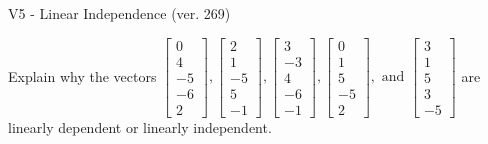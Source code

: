 \begin{exercise}
  \begin{exerciseTitle}V5 - Linear Independence (ver. 269)\end{exerciseTitle}
  \begin{exerciseStatement}
    Explain why the vectors \(\left[\begin{array}{r}
0 \\
4 \\
-5 \\
-6 \\
2
\end{array}\right] , \left[\begin{array}{r}
2 \\
1 \\
-5 \\
5 \\
-1
\end{array}\right] , \left[\begin{array}{r}
3 \\
-3 \\
4 \\
-6 \\
-1
\end{array}\right] , \left[\begin{array}{r}
0 \\
1 \\
5 \\
-5 \\
2
\end{array}\right] , \text{ and } \left[\begin{array}{r}
3 \\
1 \\
5 \\
3 \\
-5
\end{array}\right]\) are linearly dependent or linearly independent.	



\end{exerciseStatement}
\end{exercise}
